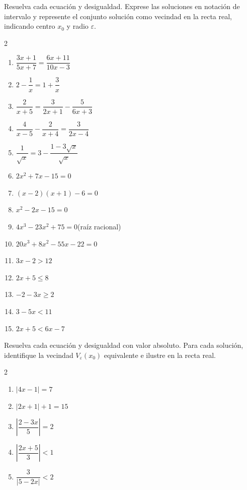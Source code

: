 \begin{prob}
Resuelva cada ecuación y desigualdad. Exprese las soluciones en notación de
intervalo y represente el conjunto solución como vecindad en la recta real,
indicando centro $x_0$ y radio $\varepsilon$.

\begin{multicols}{2}
\begin{enumerate}
   \item $\dfrac{3x+1}{5x+7} = \dfrac{6x+11}{10x-3}$
   \item $2 - \dfrac{1}{x} = 1 + \dfrac{3}{x}$
   \item $\dfrac{2}{x+5} = \dfrac{3}{2x+1} - \dfrac{5}{6x+3}$
   \item $\dfrac{4}{x-5} - \dfrac{2}{x+4} = \dfrac{3}{2x-4}$
   \item $\dfrac{1}{\sqrt{x}} = 3 - \dfrac{1-3\sqrt{x}}{\sqrt{x}}$

   \item $2x^2 + 7x - 15 = 0$
   \item $(x-2)(x+1) - 6 = 0$
   \item $x^2 - 2x - 15 = 0$
   \item $4x^3 - 23x^2 + 75 = 0$\quad (raíz racional)
   \item $20x^3 + 8x^2 - 55x - 22 = 0$

   \item $3x - 2 > 12$
   \item $2x + 5 \leq 8$
   \item $-2 - 3x \geq 2$
   \item $3 - 5x < 11$
   \item $2x + 5 < 6x - 7$
\end{enumerate}
\end{multicols}
\end{prob}

\begin{prob}
Resuelva cada ecuación y desigualdad con valor absoluto. Para cada solución,
identifique la vecindad $V_\varepsilon(x_0)$ equivalente e ilustre en la recta
real.

\begin{multicols}{2}
\begin{enumerate}
   \item $|4x - 1| = 7$
   \item $|2x + 1| + 1 = 15$
   \item $\left|\dfrac{2-3x}{5}\right| = 2$
   \item $\left|\dfrac{2x+5}{3}\right| < 1$
   \item $\dfrac{3}{|5-2x|} < 2$
\end{enumerate}
\end{multicols}
\end{prob}

